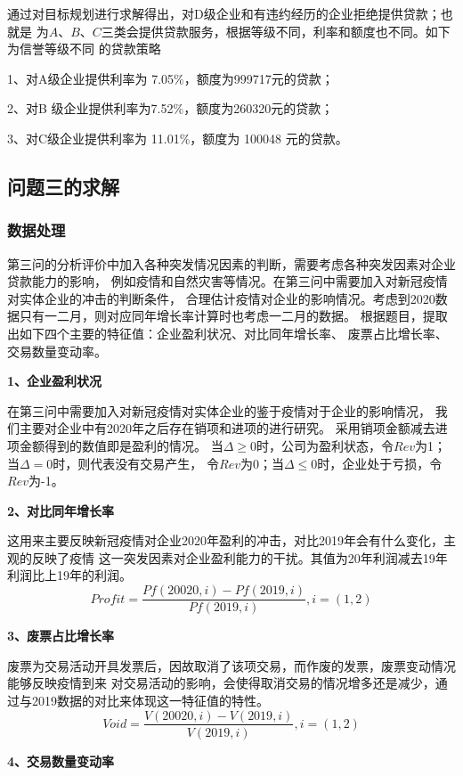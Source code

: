 \documentclass[UTF8]{ctexart}
\begin{document}
通过对目标规划进行求解得出，对D级企业和有违约经历的企业拒绝提供贷款；也就是
为$A$、$B$、$C$三类会提供贷款服务，根据等级不同，利率和额度也不同。如下为信誉等级不同
的贷款策略

1、对A级企业提供利率为 7.05$\%$，额度为999717元的贷款；

2、对B 级企业提供利率为7.52$\%$，额度为260320元的贷款；

3、对C级企业提供利率为 11.01$\%$，额度为 100048 元的贷款。
\subsection{问题三的求解}
\subsubsection{数据处理}
第三问的分析评价中加入各种突发情况因素的判断，需要考虑各种突发因素对企业贷款能力的影响，
例如疫情和自然灾害等情况。在第三问中需要加入对新冠疫情对实体企业的冲击的判断条件，
合理估计疫情对企业的影响情况。考虑到2020数据只有一二月，则对应同年增长率计算时也考虑一二月的数据。
根据题目，提取出如下四个主要的特征值：企业盈利状况、对比同年增长率、
废票占比增长率、交易数量变动率。

\textbf{1、企业盈利状况}

在第三问中需要加入对新冠疫情对实体企业的鉴于疫情对于企业的影响情况，
我们主要对企业中有2020年之后存在销项和进项的进行研究。
采用销项金额减去进项金额得到的数值即是盈利的情况。
当$\Delta \ge 0$时，公司为盈利状态，令$Rev$为1；当$\Delta = 0$时，则代表没有交易产生，
令$Rev$为0；当$\Delta \le 0$时，企业处于亏损，令$Rev$为-1。

\textbf{2、对比同年增长率}

这用来主要反映新冠疫情对企业2020年盈利的冲击，对比2019年会有什么变化，主观的反映了疫情
这一突发因素对企业盈利能力的干扰。其值为20年利润减去19年利润比上19年的利润。
\begin{equation}
	Profit = \frac{Pf(20020,i)-Pf(2019,i)}{Pf(2019,i)},i=(1,2)
\end{equation}

\textbf{3、废票占比增长率}

废票为交易活动开具发票后，因故取消了该项交易，而作废的发票，废票变动情况能够反映疫情到来
对交易活动的影响，会使得取消交易的情况增多还是减少，通过与2019数据的对比来体现这一特征值的特性。
\begin{equation}
	Void = \frac{V(20020,i)-V(2019,i)}{V(2019,i)},i=(1,2)
\end{equation}

\textbf{4、交易数量变动率}
\end{document}
